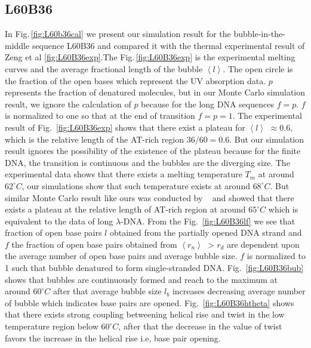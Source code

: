 \documentclass[12pt,masters,final]{UTRGVthesis}
\begin{document}
\subsection{L60B36}

In Fig.\,\ref{fig:L60b36cal} we present our simulation result for the bubble-in-the-middle sequence L60B36 and compared it with the thermal experimental result of Zeng et al \cite{zeng2003length,zeng2004bubble}\ref{fig:L60B36exp}.The Fig.\,\ref{fig:L60B36exp} is the experimental melting curves and the average fractional length of the bubble $\left< l \right> $. The open circle is the fraction of the open bases which represent the UV absorption data. $p$ represents the fraction of denatured molecules, but in our Monte Carlo simulation result, we ignore the calculation of $p$ because for the long DNA sequences $f=p$. $f$ is normalized to one so that at the end of transition $f=p=1$. The experimental result of Fig.~\ref{fig:L60B36exp} shows that there exist a plateau for $\left< l \right> $ $\approx 0.6$, which is the relative length of the AT-rich region $36/60=0.6$. But our simulation result ignores the possibility of the existence of the plateau because for the finite DNA, the transition is continuous and the bubbles are the diverging size. The experimental data shows that there exists a melting temperature $T_{m}$ at around $62^\circ C$, our simulations show that such temperature exists at around $68^\circ C$. But similar Monte Carlo result like ours was conducted by ~\cite{ares2005bubble} and showed that there exists a plateau at the relative length of AT-rich region at around $65^\circ C$  which is equivalent to the data of long $\lambda$-DNA. From the Fig.~\ref{fig:L60B36lf} we see that fraction of open base pairs $l$ obtained from the partially opened DNA strand and $f$  the fraction of open base pairs obtained from $\left< r_{n} \right> $ $> r_{d}$ are dependent upon the average number of open base pairs and average bubble size. $f$ is normalized to 1 such that bubble denatured to form single-stranded DNA. Fig.~\ref{fig:L60B36bub} shows that bubbles are continuously formed and reach to the maximum at around $60^\circ C$ after that average bubble size $l_b$ increases decreasing average number of bubble which indicates base pairs are opened. Fig.~\ref{fig:L60B36htheta} shows that there exists strong coupling betweening helical rise and twist in the low temperature region below $60^\circ C$, after that the decrease in the value of twist favors the increase in the helical rise i.e, base pair opening.
%
\newpage
\end{document}
